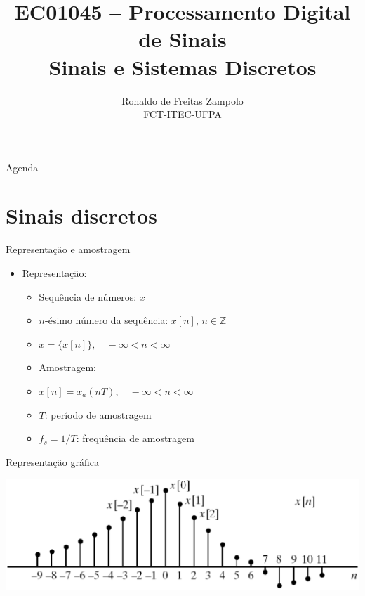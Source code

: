 \documentclass[
size=17pt,
paper=smartboard,
mode=present,
display=slidesnotes,
style=sailor,
nopagebreaks,
blackslide,
fleqn]{powerdot}
\title{\Large EC01045 -- Processamento Digital de Sinais\\ \vspace{1cm}Sinais e Sistemas Discretos}
\author{Ronaldo de Freitas Zampolo\\FCT-ITEC-UFPA}
\date{ }
\begin{document}
   \maketitle[randomdots={false}]
   \begin{slide}{Agenda}
      \tableofcontents[content=sections]
   \end{slide}

\section[slide=false]{Sinais discretos}
   \begin{slide}[toc=]{Representação e amostragem}
      \begin{itemize}
         \item Representação:
         \begin{itemize}
            \item Sequência de números: $x$
            \item $n$-ésimo número da sequência: $x[n]$, $n \in \mathbb{Z}$
            \item $x=\{x[n]\},\quad -\infty < n < \infty$
         \end{itemize}
         \begin{itemize}
         \item Amostragem:
            \item $x[n]=x_a(nT), \quad -\infty < n < \infty$
            \item $T$: período de amostragem
            \item $f_s=1/T$: frequência de amostragem
         \end{itemize}
      \end{itemize}
   \end{slide}

\begin{slide}[toc=]{Representação gráfica}
   \begin{center}
     \includegraphics[width=\textwidth]{figs/2_1.eps}
   \end{center}
\end{slide}
\end{document}
